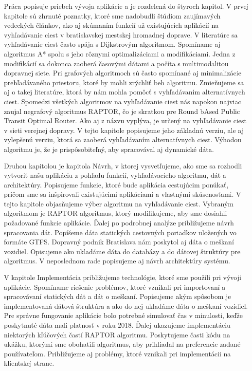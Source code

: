 Práca popisuje priebeh vývoja aplikácie a je rozdelená do štyroch kapitol. 
V prvej kapitole sú zhrnuté poznatky, ktoré sme nadobudli štúdiom zaujímavých vedeckých článkov, 
ako aj skúmaním funkcií už existujúcich aplikácií na vyhľadávanie ciest v bratislavskej mestskej hromadnej doprave. V literatúre sa vyhľadávanie ciest často spája s Dijkstrovým algoritmom.  
Spomíname aj algoritmus A* spolu s jeho rôznymi optimalizáciami a modifikáciami. Jedna z modifikácií sa dokonca zaoberá časovými dátami a počíta s multimodalitou dopravnej siete. Pri grafových algoritmoch sú často spomínané aj minimalizácie prehľadávaného priestoru, ktoré by mohli zrýchliť beh algoritmu. Zmieňujeme sa aj o takej literatúre, ktorá by nám mohla pomôcť s vyhľadávaním alternatívnych ciest. Spomedzi všetkých algoritmov na vyhľadávanie ciest nás napokon najviac zaujal negrafový algoritmus RAPTOR, čo je skratkou pre Round bAsed Public Transit Optimal Router. Ako aj z názvu vyplýva, je určený na vyhľadávanie ciest v sieti verejnej dopravy. V tejto kapitole popisujeme jeho základnú verziu, ale aj vylepšenú verziu, ktorá sa zaoberá vyhľadávaním alternatívnych ciest. Výhodou algoritmu je, že je prispôsobiteľný, aby spracovával aj dynamické dáta. 

Druhou kapitolou je kapitola Návrh, v ktorej vysvetľujeme, ako sme sa rozhodli vytvoriť našu aplikáciu z pohľadu funkcií, vyhľadávacieho algoritmu, dát a architektúry. Popisujeme funkcie, ktoré bude aplikácia cestujúcim ponúkať, pričom sme sa inšpirovali existujúcimi aplikáciami a vlastnými skúsenosťami. V tejto kapitole objasňujeme výber algoritmu na vyhľadávanie ciest. Vybraným algoritmom je RAPTOR algoritmus, ktorý modifikujeme, aby sme dosiahli požadované funkcie aplikácie. Ďalej po podrobnej analýze približujeme návrh spracovania dát. Popíšeme dáta statických cestovných poriadkov uložených vo formáte GTFS. Dopravný podnik Bratislava nám poskytol aj dáta o meškaní vozidiel. Opisujeme ako ukladáme dáta do databázy a do dátovej štruktúry pre algoritmus. V neposlednom rade popisujeme aj návrh architektúry systému.

V kapitole Implementácia približujeme technológie, ktoré sme použili pri vývoji aplikácie. Spomíname riešenie problémov, ktoré vznikali pri importovaní a spracovávaní statických dát a dát o meškaní. Popisujeme akým spôsobom je implementovaná dátová štruktúra a ako do nej ukladáme dáta o meškaní vozidiel. Pre správne fungovanie aplikácie bolo potrebné simulovať čas v minulosti, keďže poskytnuté dáta mali platnosť v roku 2018. Ďalej ukazujeme implementáciu niektorých kľúčových častí RAPTOR algoritmu. Poskytujeme časti kódu na ukážku, ktorými sme obohatili algoritmus, aby prihliadal na preferencie zadané používateľom. Približujeme aj problémy, ktoré vznikali pri implementácii na klientskej strane.


